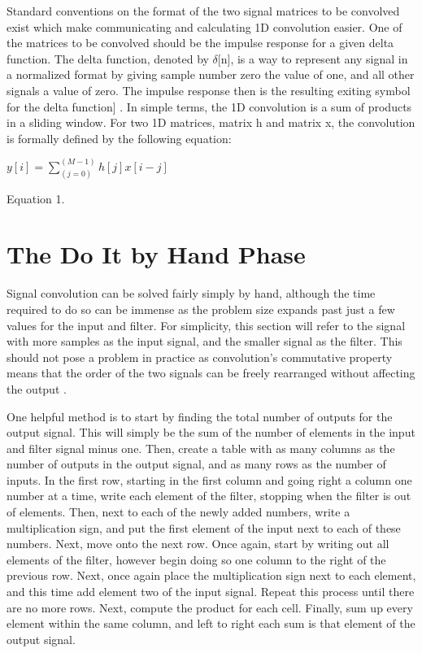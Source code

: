 \documentclass{article}
\begin{document}
Standard conventions on the format of the two signal matrices to be convolved exist which make communicating and calculating 1D convolution easier. One of the matrices to be convolved should be the impulse response for a given delta function. The delta function, denoted by $\delta$[n], is a way to represent any signal in a normalized format by giving sample number zero the value of one, and all other signals a value of zero. The impulse response then is the resulting exiting symbol for the delta function] . In simple terms, the 1D convolution is a sum of products in a sliding window. For two 1D matrices, matrix h and matrix x, the convolution is formally defined by the following equation:  

\hfil $y[i]=\sum_{(j=0)}^{(M-1)} h[j]x[i-j]$ \par
\hfil Equation 1. \par

\section{The Do It by Hand Phase}
Signal convolution can be solved fairly simply by hand, although the time required to do so can be immense as the problem size expands past just a few values for the input and filter. For simplicity, this section will refer to the signal with more samples as the input signal, and the smaller signal as the filter.  This should not pose a problem in practice as convolution’s commutative property means that the order of the two signals can be freely rearranged without affecting the output .

One helpful method is to start by finding the total number of outputs for the output signal. This will simply be the sum of the number of elements in the input and filter signal minus one. Then, create a table with as many columns as the number of outputs in the output signal, and as many rows as the number of inputs. In the first row, starting in the first column and going right a column one number at a time, write each element of the filter, stopping when the filter is out of elements. Then, next to each of the newly added numbers, write a multiplication sign, and put the first element of the input next to each of these numbers. Next, move onto the next row. Once again, start by writing out all elements of the filter, however begin doing so one column to the right of the previous row. Next, once again place the multiplication sign next to each element, and this time add element two of the input signal. Repeat this process until there are no more rows. Next, compute the product for each cell. Finally, sum up every element within the same column, and left to right each sum is that element of the output signal.
\end{document}
